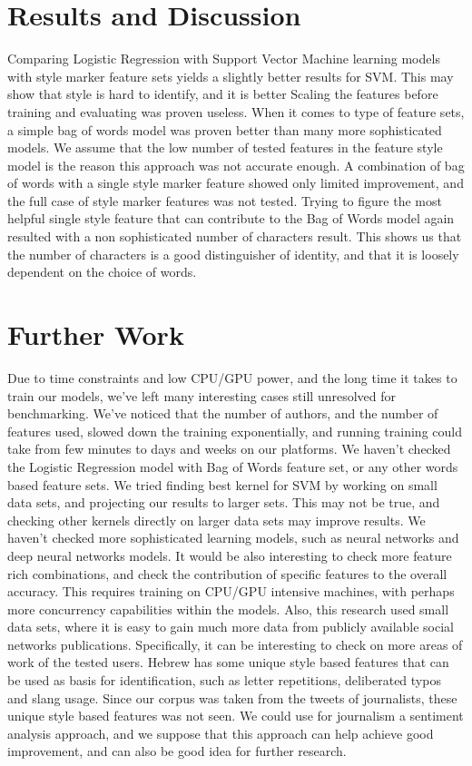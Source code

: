 \documentclass[a4paper]{article}
\begin{document}
\section{Results and Discussion}
\label{Results}

Comparing Logistic Regression with Support Vector Machine learning models with style marker feature sets yields a slightly better results for SVM.
This may show that style is hard to identify, and it is better 
Scaling the features before training and evaluating was proven useless.
When it comes to type of feature sets, a simple bag of words model was proven better than many more sophisticated models. We assume that the low number of tested features in the feature style model is the reason this approach was not accurate enough. A combination of bag of words with a single style marker feature showed only limited improvement, and the full case of style marker features was not tested.
Trying to figure the most helpful single style feature that can contribute to the Bag of Words model again resulted with a non sophisticated number of characters result. This shows us that the number of characters is a good distinguisher of identity, and that it is loosely dependent on the choice of words.

\section{Further Work}
\label{Further Work}

Due to time constraints and low CPU/GPU power, and the long time it takes to train our models, we've left many interesting cases still unresolved for benchmarking.
We've noticed that the number of authors, and the number of features used, slowed down the training exponentially, and running training could take from few minutes to days and weeks on our platforms.
We haven't checked the Logistic Regression model with Bag of Words feature set, or any other words based feature sets.
We tried finding best kernel for SVM by working on small data sets, and projecting our results to larger sets. This may not be true, and checking other kernels directly on larger data sets may improve results.
We haven't checked more sophisticated learning models, such as neural networks and deep neural networks models.
It would be also interesting to check more feature rich combinations, and check the contribution of specific features to the overall accuracy. This requires training on CPU/GPU intensive machines, with perhaps more concurrency capabilities within the models.
Also, this research used small data sets, where it is easy to gain much more data from publicly available social networks publications.
Specifically, it can be interesting to check on more areas of work of the tested users.
Hebrew has some unique style based features that can be used as basis for identification, such as letter repetitions, deliberated typos and slang usage. Since our corpus was taken from the tweets of journalists, these unique style based features was not seen.
We could use for journalism a sentiment analysis approach, and we suppose that this approach can help achieve good improvement, and can also be good idea for further research.
\end{document}
